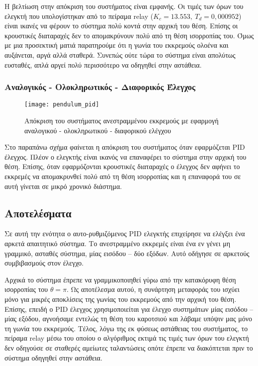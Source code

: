 Η βελτίωση στην απόκριση του συστήματος είναι εμφανής. Οι τιμές των όρων του ελεγκτή που υπολογίστηκαν από το πείραμα relay ($K_c = 13.553,\ T_d = 0,000952$) είναι ικανές να φέρουν το σύστημα πολύ κοντά στην αρχική του θέση. Επίσης οι κρουστικές διαταραχές δεν το απομακρύνουν πολύ από τη θέση ισορροπίας του. Όμως με μια προσεκτική ματιά παρατηρούμε ότι η γωνία του εκκρεμούς ολοένα και αυξάνεται, αργά αλλά σταθερά. Συνεπώς ούτε τώρα το σύστημα είναι απολύτως ευσταθές, απλά αργεί πολύ περισσότερο να οδηγηθεί στην αστάθεια.

\subsubsection{Αναλογικός - Ολοκληρωτικός - Διαφορικός Έλεγχος}

\begin{figure}[h]
  \centering
  \texttt{[image: pendulum\_pid]}
  \caption{Απόκριση του συστήματος ανεστραμμένου εκκρεμούς με εφαρμογή αναλογικού - ολοκληρωτικού - διαφορικού ελέγχου}
  \label{fig:pendulum_pid}
\end{figure}

Στο παραπάνω σχήμα φαίνεται η απόκριση του συστήματος όταν εφαρμόζεται PID έλεγχος. Πλέον ο ελεγκτής είναι ικανός να επαναφέρει το σύστημα στην αρχική του θέση. Επίσης, όταν εφαρμόζονται κρουστικές διαταραχές ο έλεγχος δεν αφήνει το εκκρεμές να απομακρυνθεί πολύ από τη θέση ισορροπίας και η επαναφορά του σε αυτή γίνεται σε μικρό χρονικό διάστημα. 

\subsection{Αποτελέσματα}

Σε αυτή την ενότητα ο αυτο-ρυθμιζόμενος PID ελεγκτής επιχείρησε να ελέγξει ένα αρκετά απαιτητικό σύστημα. Το ανεστραμμένο εκκρεμές είναι ένα εν γένει μη γραμμικό, ασταθές σύστημα, μίας εισόδου -- δύο εξόδων. Αυτό οδήγησε σε αρκετούς συμβιβασμούς στον έλεγχο.

Αρχικά το σύστημα έπρεπε να γραμμικοποιηθεί γύρω από την κατακόρυφη θέση ισορροπίας του $\theta = \pi$. Ως αποτέλεσμα αυτού, η συνάρτηση μεταφοράς του ισχύει μόνο για μικρές αποκλίσεις της γωνίας του εκκρεμούς από την αρχική του θέση. Επίσης, επειδή ο PID έλεγχος χρησιμοποιείται για έλεγχο συστημάτων μίας εισόδου -- μίας εξόδου, αγνοήσαμε εντελώς τη θέση του καροτσιού και λάβαμε υπόψιν μας μόνο τη γωνία του εκκρεμούς. Τέλος, λόγω της εκ φύσεως αστάθειας του συστήματος, το πείραμα relay μέσω του οποίου ο αλγόριθμος εκτιμά τις τιμές των όρων του ελεγκτή δεν οδηγούσε σε σταθερές αμείωτες ταλαντώσεις οπότε έπρεπε να διακόπτεται πριν το σύστημα οδηγηθεί στην αστάθεια. 

